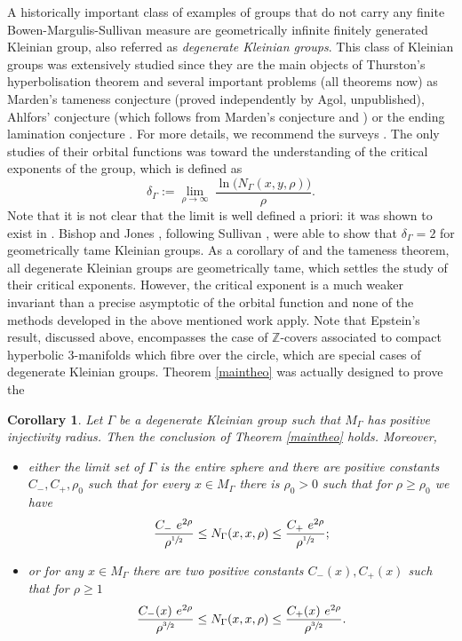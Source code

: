 \documentclass[10pt]{amsart}
\theoremstyle{plain}
\newtheorem{corollary}[equation]{Corollary}
\theoremstyle{definition}
\newcommand{\ZZ}{\mathbb{Z}}
\newcommand{\limi}[1]{\underset{#1}{\lim}}
\begin{document}
A historically important class of examples of groups that do not carry any finite Bowen-Margulis-Sullivan measure are geometrically infinite finitely generated Kleinian group, also referred as \emph{degenerate Kleinian groups}. This class of Kleinian groups was extensively studied since they are the main objects of Thurston's hyperbolisation theorem \cite{livremcmumu,livreotal2001hyperbolization} and several important problems (all theorems now) as Marden's tameness conjecture \cite{arttamenesscalegarigabai} (proved independently by Agol, unpublished), Ahlfors' conjecture (which follows from Marden's conjecture and \cite{articlecanary}) or the ending lamination conjecture \cite{artendinglamination}. For more details, we recommend the surveys \cite{surveycanarymarden,surveyminsky}. The only studies of their orbital functions was toward the understanding of the critical exponents of the group, which is defined as
\[
\delta_{\Gamma} := \limi{\rho \to \infty} \ \frac{ \ln \big(N_{\Gamma}(x,y,\rho) \big)}{\rho}.
\]
Note that it is not clear that the limit is well defined a priori: it was shown to exist in \cite{artroblinfoncorb}. Bishop and Jones \cite{articlebishopjones,artbishopjonescriticalgeometricfiniteness}, following Sullivan \cite{articlesullivandemicylindre}, were able to show that $\delta_{\Gamma} =2$ for geometrically tame Kleinian groups. As a corollary of \cite{articlecanary} and the tameness theorem, all degenerate Kleinian groups are geometrically tame, which settles the study of their critical exponents. However, the critical exponent is a much weaker invariant than a precise asymptotic of the orbital function and none of the methods developed in the above mentioned work apply. Note that Epstein's result, discussed above, encompasses the case of $\ZZ$-covers associated to compact hyperbolic 3-manifolds which fibre over the circle, which are special cases of degenerate Kleinian groups. Theorem \ref{maintheo} was actually designed to prove the

\begin{corollary}
\label{maincor}
Let $\Gamma$ be a degenerate Kleinian group such that $M_{\Gamma}$ has positive injectivity radius. Then the conclusion of Theorem \ref{maintheo} holds. Moreover,
\begin{itemize}
\item either the limit set of $\Gamma$ is the entire sphere and there are positive constants $C_-, C_+, \rho_0$ such that for every $x \in M_{\Gamma}$ there is $\rho_0 > 0$ such that for $\rho \ge \rho_0$ we have
\[
\frac{ C_- \ e^{ 2 \rho}}{\rho^{\sfrac{1}{2}}} \le N_{\Gamma}(x,x,\rho) \le \frac{ C_+ \ e^{2 \rho}}{\rho^{\sfrac{1}{2}}} ;
\]
\item or for any $x \in M_{\Gamma}$ there are two positive constants $C_-(x), C_+(x)$ such that for $\rho \ge 1$
\[
\frac{ C_-(x) \ e^{ 2 \rho}}{\rho^{\sfrac{3}{2}}} \le N_{\Gamma}(x,x,\rho) \le \frac{ C_+(x) \ e^{2 \rho}}{\rho^{\sfrac{3}{2}}}.
\]
\end{itemize}
\end{corollary}
\end{document}
